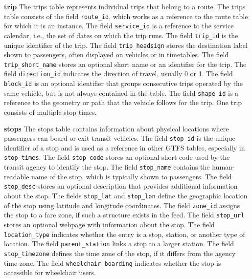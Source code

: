\par\medskip
\noindent\textbf{trip} \quad
The trips table represents individual trips that belong to a route. The trips table consists of the field \texttt{route\_id}, which works as a reference to the route table for which it is an instance. The field \texttt{service\_id} is a reference to the service calendar, i.e., the set of dates on which the trip runs. The field \texttt{trip\_id} is the unique identifier of the trip. The field \texttt{trip\_headsign} stores the destination label shown to passengers, often displayed on vehicles or in timetables. The field \texttt{trip\_short\_name} stores an optional short name or an identifier for the trip. The field \texttt{direction\_id} indicates the direction of travel, usually 0 or 1. The field \texttt{block\_id} is an optional identifier that groups consecutive trips operated by the same vehicle, but is not always contained in the table. The field \texttt{shape\_id} is a reference to the geometry or path that the vehicle follows for the trip. One trip consists of multiple stop times.

\par\medskip
\noindent\textbf{stops} \quad
The stops table contains information about physical locations where passengers can board or exit transit vehicles. The field \texttt{stop\_id} is the unique identifier of a stop and is used as a reference in other GTFS tables, especially in \texttt{stop\_times}. The field \texttt{stop\_code} stores an optional short code used by the transit agency to identify the stop. The field \texttt{stop\_name} contains the human-readable name of the stop, which is typically shown to passengers. The field \texttt{stop\_desc} stores an optional description that provides additional information about the stop. The fields \texttt{stop\_lat} and \texttt{stop\_lon} define the geographic location of the stop using latitude and longitude coordinates. The field \texttt{zone\_id} assigns the stop to a fare zone, if such a structure exists in the feed. The field \texttt{stop\_url} stores an optional webpage with information about the stop. The field \texttt{location\_type} indicates whether the entry is a stop, station, or another type of location. The field \texttt{parent\_station} links a stop to a larger station. The field \texttt{stop\_timezone} defines the time zone of the stop, if it differs from the agency time zone. The field \texttt{wheelchair\_boarding} indicates whether the stop is accessible for wheelchair users.



